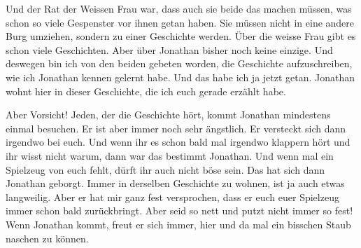 \begin{mdframed}[style=mystyle]
Und der Rat der Weissen Frau war, dass auch sie beide das machen müssen, was schon so viele Gespenster vor ihnen getan haben. Sie müssen nicht in eine andere Burg umziehen, sondern zu einer Geschichte werden. Über die weisse Frau gibt es schon viele Geschichten. Aber über Jonathan bisher noch keine einzige. Und deswegen bin ich von den beiden gebeten worden, die Geschichte aufzuschreiben, wie ich Jonathan kennen gelernt habe. Und das habe ich ja jetzt getan. Jonathan wohnt hier in dieser Geschichte, die ich euch gerade erzählt habe. 

Aber Vorsicht! Jeden, der die Geschichte hört, kommt Jonathan mindestens einmal besuchen. Er ist aber immer noch sehr ängstlich. Er versteckt sich dann irgendwo bei euch. Und wenn ihr es schon bald mal irgendwo klappern hört und ihr wisst nicht warum, dann war das bestimmt Jonathan. Und wenn mal ein Spielzeug von euch fehlt, dürft ihr auch nicht böse sein. Das hat sich dann Jonathan geborgt. Immer in derselben Geschichte zu wohnen, ist ja auch etwas langweilig. Aber er hat mir ganz fest versprochen, dass er euch euer Spielzeug immer schon bald zurückbringt. Aber seid so nett und putzt nicht immer so fest! Wenn Jonathan kommt, freut er sich immer, hier und da mal ein bisschen Staub naschen zu können. \hfill {\color{DeepPink}\decofourleft}
\end{mdframed}

